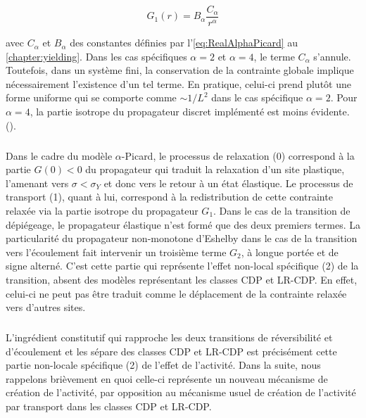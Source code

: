 \begin{equation}
	G_1(r) = B_\alpha\frac{C_\alpha}{r^\alpha}
\end{equation}

\noindent avec $C_\alpha$ et $B_\alpha$ des constantes définies par l'\autoref{eq:RealAlphaPicard} au \autoref{chapter:yielding}. Dans les cas spécifiques $\alpha = 2$ et $\alpha = 4$, le terme $C_\alpha$ s'annule. Toutefois, dans un système fini, la conservation de la contrainte globale implique nécessairement l'existence d'un tel terme. En pratique, celui-ci prend plutôt une forme uniforme qui se comporte comme $\sim 1/L^2$ dans le cas spécifique $\alpha = 2$. Pour $\alpha = 4$, la partie isotrope du propagateur discret implémenté est moins évidente. ().


\subparagraph{}Dans le cadre du modèle $\alpha$-Picard, le processus de relaxation (0) correspond à la partie $G(0)<0$ du propagateur qui traduit la relaxation d'un site plastique, l'amenant vers $\sigma < \sigma_Y$ et donc vers le retour à un état élastique. Le processus de transport (1), quant à lui, correspond à la redistribution de cette contrainte relaxée via la partie isotrope du propagateur $G_1$. Dans le cas de la transition de dépiégeage, le propagateur élastique n'est formé que des deux premiers termes. La particularité du propagateur non-monotone d'Eshelby dans le cas de la transition vers l'écoulement fait intervenir un troisième terme $G_2$, à longue portée et de signe alterné. C'est cette partie qui représente l'effet non-local spécifique (2) de la transition, absent des modèles représentant les classes CDP et LR-CDP. En effet, celui-ci ne peut pas être traduit comme le déplacement de la contrainte relaxée vers d'autres sites.

\subparagraph{}L'ingrédient constitutif qui rapproche les deux transitions de réversibilité et d'écoulement et les sépare des classes CDP et LR-CDP est précisément cette partie non-locale spécifique (2) de l'effet de l'activité. Dans la suite, nous rappelons brièvement en quoi celle-ci représente un nouveau mécanisme de création de l'activité, par opposition au mécanisme usuel de création de l'activité par transport dans les classes CDP et LR-CDP.

\begingroup

\setlength{\tabcolsep}{10pt}
\renewcommand{\arraystretch}{1.5}

